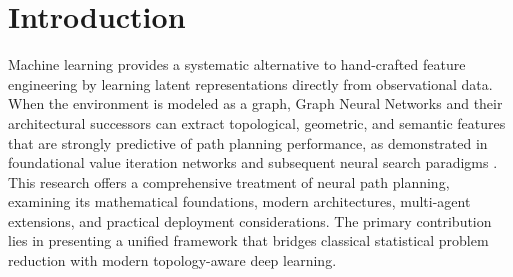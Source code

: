 \documentclass[twoside]{article}
\begin{document}
	\section{Introduction}

	

	Machine learning provides a systematic alternative to hand-crafted feature engineering by learning latent representations directly from observational data. When the environment is modeled as a graph, Graph Neural Networks and their architectural successors can extract topological, geometric, and semantic features that are strongly predictive of path planning performance, as demonstrated in foundational value iteration networks \cite{tamar2016} and subsequent neural search paradigms \cite{yonetani2021, li2018combinatorial}. This research offers a comprehensive treatment of neural path planning, examining its mathematical foundations, modern architectures, multi-agent extensions, and practical deployment considerations. The primary contribution lies in presenting a unified framework that bridges classical statistical problem reduction with modern topology-aware deep learning. %

	

\end{document}
